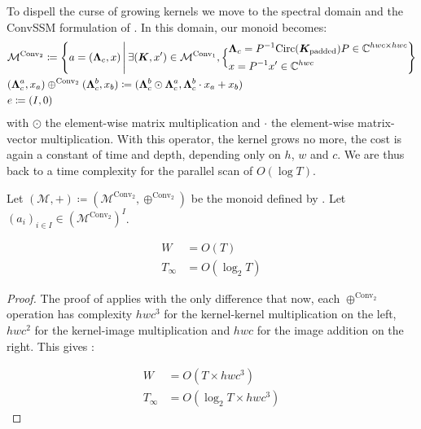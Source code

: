 \documentclass{article}
\begin{document}
To dispell the curse of growing kernels we move to the spectral domain and the ConvSSM formulation of . In this domain, our monoid becomes:
\begin{align}
\label{eq:M_SSM_spectral}
    &\mathcal{M}^{\mathrm{Conv}_2}\coloneqq \left\{ a = (\bm{\Lambda}_c, x)\,\middle|\,\exists (\bm{K}, x')\in \mathcal{M}^{\mathrm{Conv}_1},\Bigl\{
\begin{aligned}
    &\bm{\Lambda}_c = P^{-1} \mathrm{Circ}(\bm{K}_{\mathrm{padded}}) P \in \mathbb{C}^{hwc \times hwc}\\
    &x = P^{-1} x' \in \mathbb{C}^{h w c}
\end{aligned}
\Bigr.\right\}\\
\label{eq:+_SSM_spectral}
    &(\bm{\Lambda}^a_c, x_a) \oplus^{\mathrm{Conv}_2} (\bm{\Lambda}^b_c, x_b)\coloneqq (\bm{\Lambda}^b_c \odot \bm{\Lambda}^a_c, \bm{\Lambda}^b_c \cdot x_a + x_b)\\
\label{eq:0_SSM_spectral}
    &e\coloneqq(I, 0)
\end{align}
\noindent with $\odot$ the element-wise matrix multiplication and $\cdot$ the element-wise matrix-vector multiplication. With this operator, the kernel grows no more, the cost is again a constant of time and depth, depending only on $h$, $w$ and $c$. We are thus back to a time complexity for the parallel scan of $O(\log T)$.

\begin{proposition}
    Let $(\mathcal{M}, +) \coloneqq (\mathcal{M}^{\mathrm{Conv}_2}, \oplus^{\mathrm{Conv}_2})$ be the monoid defined by . Let $(a_i)_{i\in I}\in (\mathcal{M}^{\mathrm{Conv}_2})^I$.

\begin{align}
    W&= O(T)\\
    T_\infty&= O(\log_2T)
\end{align}
\end{proposition}

\begin{proof}
The proof of  applies with the only difference that now, each $\oplus^{\mathrm{Conv}_2}$ operation has complexity $h w c^3$ for the kernel-kernel multiplication on the left, $h w c^2$ for the kernel-image multiplication and $h w c$ for the image addition on the right. This gives :

\begin{align}
\label{eq:W_spectral}
    W&= O(T \times h w c^3)\\
\label{eq:T_spectral}
    T_\infty&= O(\log_2T \times h w c^3)
\end{align}
\end{proof}
\end{document}

